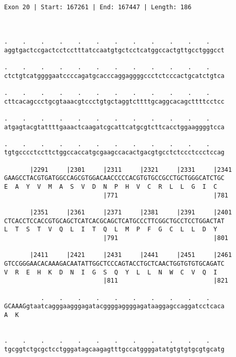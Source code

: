 \documentclass{article}
\begin{document}
\begin{Verbatim}
                                       
 
Exon 20 | Start: 167261 | End: 167447 | Length: 186



.    .    .    .    .    .    .    .    .    .    .    .    
aggtgactccgactcctcctttatccaatgtgctcctcatggccactgttgcctgggcct
                                                            
.    .    .    .    .    .    .    .    .    .    .    .    
ctctgtcatggggaatccccagatgcacccaggaggggccctctcccactgcatctgtca
                                                            
.    .    .    .    .    .    .    .    .    .    .    .    
cttcacagccctgcgtaaacgtccctgtgctaggtcttttgcaggcacagcttttcctcc
                                                            
.    .    .    .    .    .    .    .    .    .    .    .    
atgagtacgtattttgaaactcaagatcgcattcatgcgtcttcacctggaaggggtcca
                                                            
.    .    .    .    .    .    .    .    .    .    .    .    
tgtgcccctccttctggccaccatgcgaagccacactgacgtgcctctccctccctccag
                                                            
       |2291     |2301     |2311     |2321     |2331     |2341
GAAGCCTACGTGATGGCCAGCGTGGACAACCCCCACGTGTGCCGCCTGCTGGGCATCTGC
E  A  Y  V  M  A  S  V  D  N  P  H  V  C  R  L  L  G  I  C  
                           |771                          |781
  
       |2351     |2361     |2371     |2381     |2391     |2401
CTCACCTCCACCGTGCAGCTCATCACGCAGCTCATGCCCTTCGGCTGCCTCCTGGACTAT
L  T  S  T  V  Q  L  I  T  Q  L  M  P  F  G  C  L  L  D  Y  
                           |791                          |801
  
       |2411     |2421     |2431     |2441     |2451     |2461
GTCCGGGAACACAAAGACAATATTGGCTCCCAGTACCTGCTCAACTGGTGTGTGCAGATC
V  R  E  H  K  D  N  I  G  S  Q  Y  L  L  N  W  C  V  Q  I  
                           |811                          |821
  
          .    .    .    .    .    .    .    .    .    .    
GCAAAGgtaatcagggaagggagatacggggaggggagataaggagccaggatcctcaca
A  K                                                        
                                                            
  
.    .    .    .    .    .    .    .    .    .    .    .    
tgcggtctgcgctcctgggatagcaagagtttgccatggggatatgtgtgtgcgtgcatg
                                                            

\end{Verbatim}
\end{document}

